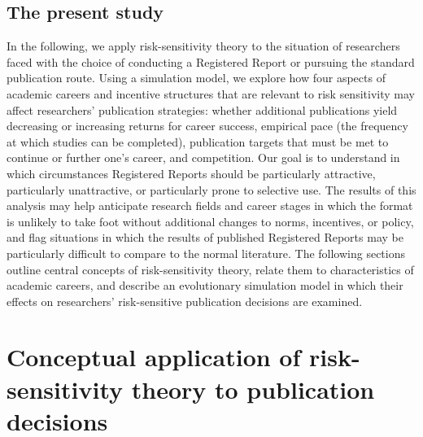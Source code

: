 \documentclass[
  british,
  a4paper,
  ,man,mask,floatsintext]{apa6}
\begin{document}
\subsection{The present study}\label{the-present-study}

In the following, we apply
risk-sensitivity theory to
the situation of researchers faced with the choice of conducting a Registered Report or pursuing the standard publication route.
Using a simulation model, we explore how four aspects of academic careers and incentive structures that are relevant to risk sensitivity may affect researchers' publication strategies:
whether additional publications yield decreasing or increasing returns for career success, empirical pace (the frequency at which studies can be completed), publication targets that must be met to continue or further one's career, and competition.
Our goal is to understand in which circumstances Registered Reports should be particularly attractive, particularly unattractive, or particularly prone to selective use.
The results of this analysis may help anticipate research fields and career stages in which the format is unlikely to take foot without additional changes to norms, incentives, or policy, and flag situations in which the results of published Registered Reports may be particularly difficult to compare to the normal literature.
The following sections outline central concepts of risk-sensitivity theory, relate them to characteristics of academic careers, and describe an evolutionary simulation model in which their effects on researchers' risk-sensitive publication decisions are examined.

\section{Conceptual application of risk-sensitivity theory to publication decisions}\label{conceptual-application-of-risk-sensitivity-theory-to-publication-decisions}
\end{document}
